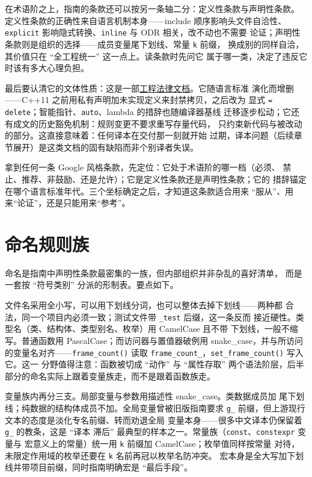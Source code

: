 \documentclass[12pt,a4paper,fontset=fandol]{ctexbook}
\newcommand{\cpp}[1]{C++#1}
\newcommand{\Fn}[1]{\texttt{#1()}}
\newcommand{\Tp}[1]{\texttt{#1}}
\newcommand{\Bk}{\discretionary{}{}{}}
\newcommand{\Lang}[1]{\textsf{#1}}
\newcommand{\DomGo}{\Lang{Google}}
\begin{document}
在术语阶之上，指南的条款还可以按另一条轴二分：定义性条款与声明性条款。
定义性条款的正确性来自语言机制本身——include 顺序影响头文件自洽性、
\Tp{explicit} 影响隐式转换、\Tp{inline} 与 ODR 相关，改不动也不需要
论证；声明性条款则是组织的选择——成员变量尾下划线、常量 \Tp{k} 前缀，
换成别的同样自洽，其价值只在 ``全工程统一'' 这一点上。读条款时先问它
属于哪一类，决定了违反它时该有多大心理负担。

最后要认清它的文体性质：这是一部\underline{工程法律文档}。它随语言标准
演化而增删——\cpp{11} 之前用私有声明加未实现定义来封禁拷贝，之后改为
显式 \Tp{= delete}；智能指针、\Tp{auto}、lambda 的措辞也随编译器基线
迁移逐步松动；它还有成文的历史豁免机制：规则变更不要求重写存量代码，
只约束新代码与被改动的部分。这直接意味着：任何译本在交付那一刻就开始
过期，译本问题（后续章节展开）是这类文档的固有缺陷而非个别译者失误。

\begin{guideline}[title={读条款前先定位三件事}]
拿到任何一条 \DomGo{} 风格条款，先定位：它处于术语阶的哪一档（必须、
禁止、推荐、非鼓励、还是允许）；它是定义性条款还是声明性条款；它的
措辞锚定在哪个语言标准年代。三个坐标确定之后，才知道这条款适合用来
``服从''、用来``论证''，还是只能用来``参考''。
\end{guideline}

\section{命名规则族}
\label{sec:ch02-naming}

命名是指南中声明性条款最密集的一族，但内部组织并非杂乱的喜好清单，
而是一套按 ``符号类别'' 分派的形制表。要点如下。

文件名采用全小写，可以用下划线分词，也可以整体去掉下划线——两种都
合法，同一个项目内必须一致；测试文件带 \Tp{\_test} 后缀，这一条反而
接近硬性。类型名（类、结构体、类型别名、枚举）用 CamelCase 且不带
下划线，一般不缩写。普通函数用 PascalCase；而访问器与置值器破例用
snake\_case，并与所访问的变量名对齐——\Fn{frame{\Bk}\_count} 读取
\Tp{frame{\Bk}\_count\_}，\Fn{set{\Bk}\_frame{\Bk}\_count} 写入它。这一
分野值得注意：函数被切成 ``动作'' 与 ``属性存取'' 两个语法阶层，后半
部分的命名实际上跟着变量族走，而不是跟着函数族走。

变量族内再分三支。局部变量与参数用描述性 snake\_case。类数据成员加
尾下划线；纯数据的结构体成员不加。全局变量曾被旧版指南要求
\Tp{g{\Bk}\_} 前缀，但上游现行文本的态度是淡化专名前缀、转而劝退全局
变量本身——很多中文译本仍保留着 \Tp{g{\Bk}\_} 的教条，这是 ``译本
滞后'' 最典型的样本之一。常量族（\Tp{const}、\Tp{constexpr} 变量与
宏意义上的常量）统一用 \Tp{k} 前缀加 CamelCase；枚举值同样按常量
对待，未限定作用域的枚举还要在 \Tp{k} 名前再冠以枚举名防冲突。
宏本身是全大写加下划线并带项目前缀，同时指南明确宏是
``最后手段''。
\end{document}
